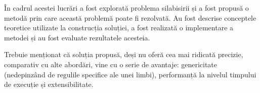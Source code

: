 În cadrul acestei lucrări a fost explorată problema silabisirii și a fost propusă o metodă prin care această problemă poate fi rezolvată. Au fost descrise conceptele teoretice utilizate la construcția soluției, a fost realizată o implementare a metodei și au fost evaluate rezultatele acesteia. 

Trebuie menționat că soluția propusă, deși nu oferă cea mai ridicată precizie, comparativ cu alte abordări, vine cu o serie de avantaje: genericitate (nedepinzând de regulile specifice ale unei limbi), performanță la nivelul timpului de execuție și extensibilitate.









